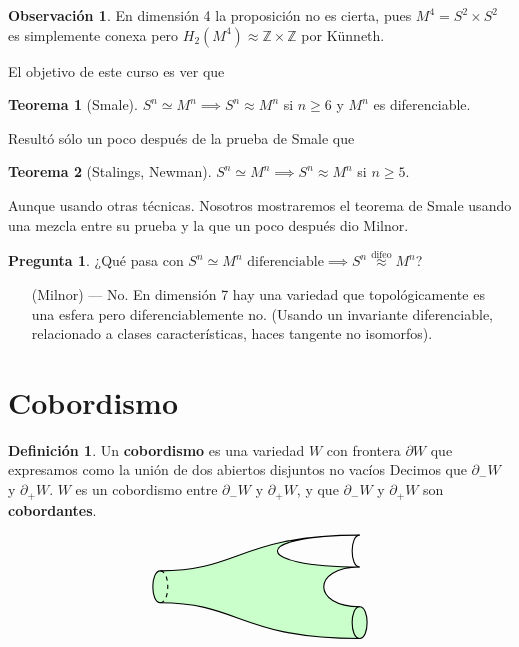\documentclass[spanish]{book}
\theoremstyle{definition}
\newtheorem*{defn}{Definición}
\newtheorem*{obs}{Observación}
\newtheorem*{teo}{Teorema}
\newtheorem*{pregunta}{Pregunta}
\newcommand{\Z}{\mathbb{Z}}
\begin{document}
\begin{obs}
	En dimensión 4 la proposición no es cierta, pues $M^4=S^2\times S^2$ es simplemente conexa pero $H_2(M^4)\approx\Z\times\Z$ por Künneth.
\end{obs}

El objetivo de este curso es ver que
\begin{teo}[Smale]
	$S^n\simeq M^n\implies S^n\approx M^n$ si $n\geq 6$ y $M^n$ es diferenciable.
\end{teo}
Resultó sólo un poco después de la prueba de Smale que
\begin{teo}[Stalings, Newman]
	$S^n\simeq M^n\implies S^n\approx M^n$ si $n\geq 5$.
\end{teo}
Aunque usando otras técnicas. Nosotros mostraremos el teorema de Smale usando una mezcla entre su prueba y la que un poco después dio Milnor.

\begin{pregunta}
	¿Qué pasa con $S^n\simeq M^n \text{ diferenciable}\implies S^n\overset{\text{difeo}}{\approx} M^n$?
\end{pregunta}
\begin{enumerate}
	\item[(Milnor) ---]  No. En dimensión 7 hay una variedad que topológicamente es una esfera pero diferenciablemente no. (Usando un invariante diferenciable, relacionado a clases características, haces tangente no isomorfos).
\end{enumerate}


\section{Cobordismo}
\begin{defn}
	Un \textbf{cobordismo} es una variedad $W$ con frontera $\partial W$ que expresamos como la unión de dos abiertos disjuntos no vacíos Decimos que $\partial_-W$ y $\partial_+W$. $W$ es un cobordismo entre $\partial_-W$ y $\partial_+W$, y que $\partial_-W$ y $\partial_+W$ son \textbf{cobordantes}.
\end{defn}

\[\begin{tikzpicture}[thick]
	\filldraw[fill=green!25, fill opacity=0.8]
	(1,2.6) .. controls (0.75,2.6) and (0.75,3.4) .. (1,3.4) .. 
	controls (3,3.4) and (3,4.3) .. (6,4.3) .. 
	controls (3.25,4.3) and (3.25,3.5) .. (6,3.5) .. 
	controls (4.8,3.5) and (4.8,2.5) .. (6,2.5) .. 
	controls (6.25,2.5) and (6.25,1.7) .. (6,1.7) ..
	controls (3,1.7) and (3,2.6) .. (1,2.6);
	\draw[dashed]
	(1,2.6) .. controls (1.25,2.6) and (1.25,3.4) .. (1,3.4);
	\draw  
	(6,4.3) .. controls (5.75,4.3) and (5.75,3.5) .. (6,3.5);
	\draw
	(6,2.5) .. controls (5.75,2.5) and (5.75,1.7) .. (6,1.7);
\end{tikzpicture}\]
\end{document}
